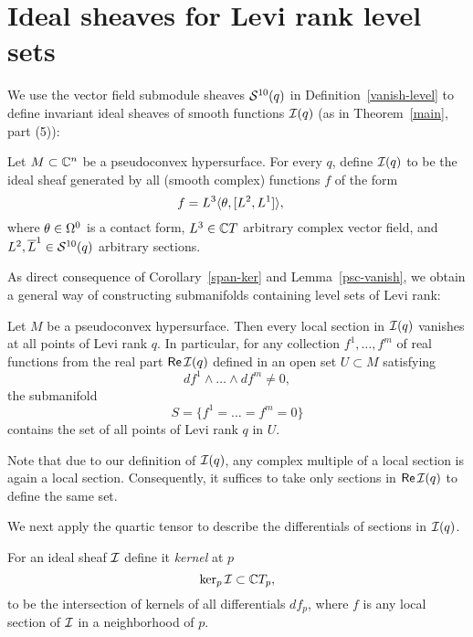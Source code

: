\documentclass[12pt]{amsart}
\begin{document}
\section{Ideal sheaves for Levi rank level sets}

We use the vector field submodule 
sheaves ${\mathcal{S}}^{10}(q)$ in Definition~\ref{vanish-level}
to define invariant ideal sheaves of smooth functions 
${\mathcal{I}}(q)$ (as in Theorem~\ref{main}, part (5)):


%
%
%
%

\bd
Let $M\subset{{\mathbb{C}}^n}$ be a pseudoconvex hypersurface.
For every $q$,
define ${\mathcal{I}}(q)$ to be the ideal sheaf 
generated by all (smooth complex) functions $f$ of the form
$$
	f = L^3 \langle \theta, [L^2, L^1] \rangle,
	\quad 
$$
where $\theta\in\Omega^0$ is a contact form, 
$L^3\in {\mathbb{C}} T$ arbitrary complex vector field,
and $L^2, \overline{L}^1 \in {\mathcal{S}}^{10}(q)$
arbitrary sections.
\ed

As direct consequence of Corollary~\ref{span-ker} and 
Lemma~\ref{psc-vanish}, we obtain
a general way of constructing submanifolds
containing level sets of Levi rank:

\bc{}
Let $M$ be a pseudoconvex hypersurface.
Then every local section in ${\mathcal{I}}(q)$
vanishes at all points of Levi rank $q$.
In particular, for any collection $f^1, \ldots, f^m$
of real functions from the real part ${\sf Re}\, {\mathcal{I}}(q)$
defined in an open set $U\subset M$
satisfying 
$$
	df^1 \wedge \ldots \wedge df^m\ne 0,
$$
the submanifold
$$
	S = \{ f^1 = \ldots = f^m =0 \}
$$
contains the set of all points of Levi rank $q$ in $U$.
\ec

\br
Note that due to our definition of ${\mathcal{I}}(q)$,
any complex multiple of a local section is again a local section.
Consequently, it suffices to take only sections in ${\sf Re}\, {\mathcal{I}}(q)$
to define the same set.
\er


We next apply the quartic tensor to describe the differentials
of sections in ${\mathcal{I}}(q)$.

\bd
For an ideal sheaf ${\mathcal{I}}$ define it {\em kernel} at $p$
$$
	\ker_p {\mathcal{I}} \subset {\mathbb{C}} T_p,
$$
to be the intersection of kernels of all differentials $df_p$,
where $f$ is any local section of ${\mathcal{I}}$ in a neighborhood of $p$.
\ed
\end{document}
